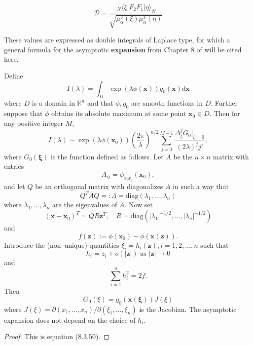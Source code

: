 \begin{equation}
  \mathcal{D}=  \frac{\,_{N}  \langle\xi|F_2F_1|\eta\rangle_{N}}{\sqrt{ \mu_\alpha^3(\xi) \mu_\alpha^3(\eta)}}
\end{equation}


These values are expressed as double integrals of Laplace type, for which a general formula for the asymptotic \textbf{expansion} from Chapter 8 of \cite{BLBook} will be cited here.

\begin{theorem}
Define 
$$
I(\lambda) = \int_D \exp(\lambda \phi(\mathbf{x})) g_0(\mathbf{x})d \mathbf{x}
$$
where $D$ is a domain in $\mathbb{R}^n$ and that $\phi,g_0$ are smooth functions in $D$. Further suppose that $\phi$ obtains its absolute maximum at some point $\mathbf{x}_0 \in D$. Then for any positive integer $M$,
$$
I(\lambda) \sim \exp(\lambda\phi(\mathbf{x}_0)) \left( \frac{2\pi}{\lambda}\right)^{n/2} \sum_{j=0}^{M-1} \frac{\Delta_{\xi}^j G_0 \vert_{\xi=0}}{(2\lambda)^jj!},
$$
where $G_0(\mathbf{\xi})$ is the function defined as follows. Let $A$ be the $n\times n$ matrix with entries
$$
A_{ij} = \phi_{x_ix_j}(\mathbf{x}_0),
$$
and let $Q$ be an orthogonal matrix with diagonalizes $A$ in such a way that
$$
Q^TAQ =: \Lambda = \mathrm{diag}(\lambda_1,\ldots,\lambda_n)
$$
where $\lambda_1,\ldots,\lambda_n$ are the eigenvalues of $A$. Now set
$$
(\mathbf{x} - \mathbf{x}_0)^T = QR \mathbf{z}^T, \quad R = \mathrm{diag}(| \lambda_1|^{-1/2}, \ldots, | \lambda_n|^{-1/2})
$$
and 
$$
f(\mathbf{z}) := \phi(\mathbf{x}_0) - \phi(\mathbf{x}(\mathbf{z})).
$$
Introduce the (non--unique) quantities $\xi_i = h_i(\mathbf{z}), i=1,2,\ldots,n$ such that $$h_i = z_i + o(\vert \mathbf{z} \vert) \text{ as }\vert \mathbf{z} \vert \rightarrow 0$$ and
$$
\sum_{i=1}^n h_i^2 = 2f.
$$
Then
$$
G_0(\xi) = g_0(\mathbf{x}(\mathbf{\xi}))J(\xi)
$$
where $J(\xi) = \partial(x_1,\ldots,x_n)/\partial(\xi_1,\ldots,\xi_n)$ is the Jacobian. The asymptotic expansion does not depend on the choice of $h_i$. 
\end{theorem}
\begin{proof}
This is equation (8.3.50).
\end{proof}


